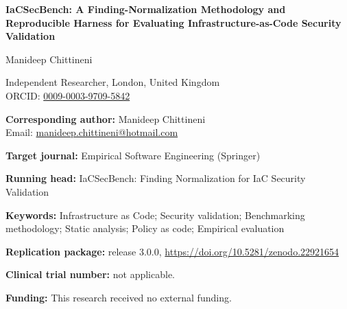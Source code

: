 \documentclass[11pt,a4paper]{article}
\begin{document}
\begin{center}
{\Large\bfseries IaCSecBench: A Finding-Normalization Methodology and Reproducible
Harness for Evaluating Infrastructure-as-Code Security Validation\par}
\bigskip
{\large Manideep Chittineni\par}
\medskip
Independent Researcher, London, United Kingdom\\
ORCID: \href{https://orcid.org/0009-0003-9709-5842}{0009-0003-9709-5842}
\end{center}

\bigskip
\noindent\textbf{Corresponding author:} Manideep Chittineni\\
Email: \href{mailto:manideep.chittineni@hotmail.com}{manideep.chittineni@hotmail.com}

\medskip
\noindent\textbf{Target journal:} Empirical Software Engineering (Springer)

\medskip
\noindent\textbf{Running head:} IaCSecBench: Finding Normalization for IaC Security Validation

\medskip
\noindent\textbf{Keywords:} Infrastructure as Code; Security validation;
Benchmarking methodology; Static analysis; Policy as code; Empirical evaluation

\medskip
\noindent\textbf{Replication package:} release 3.0.0,
\href{https://doi.org/10.5281/zenodo.22921654}{https://doi.org/10.5281/zenodo.22921654}

\medskip
\noindent\textbf{Clinical trial number:} not applicable.

\medskip
\noindent\textbf{Funding:} This research received no external funding.
\end{document}
